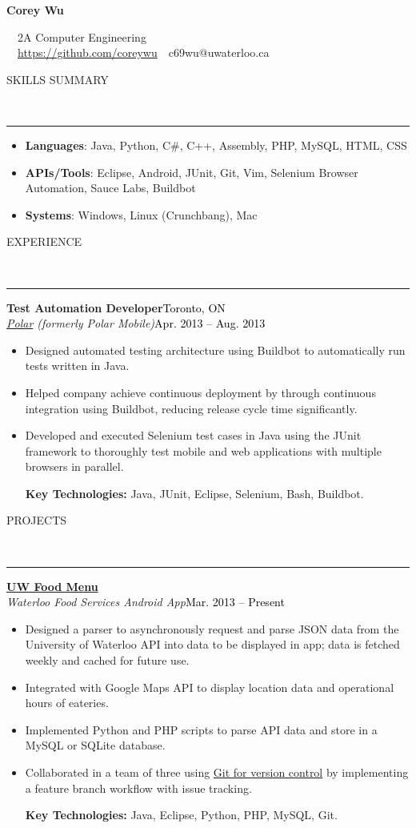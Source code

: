 \documentclass[11pt, letterpaper, oneside]{article}
\makeatletter
\newcommand{\name}{Corey Wu}
\newcommand{\program}{2A Computer Engineering}
\newcommand{\github}{\href{https://github.com/coreywu}{https://github.com/coreywu}}
\newcommand{\email}{c69wu@uwaterloo.ca}
\newcommand{\HRule}[2]{\textcolor{#1}{\rule{\linewidth}{#2}}}
\newcommand{\sectiontitle}[1]{\begin{minipage}{\textwidth}\vspace{-7.5pt}\begin{flushleft}\hspace{-20.5pt}\vspace{-25pt}
\Large\MakeUppercase{#1}\end{flushleft}\end{minipage}\\\HRule{black}{0.15mm}\vspace{\baselineskip}}
\newenvironment{ressection}[1]{
  \sectiontitle{#1}}
  {\vspace{-\baselineskip}}
\newcommand{\resentryheader}[4]{
    \vspace{-6pt}
    \textbf{#1}\hspace{\stretch{1}}\textcolor{black}{#3}\\
    \textit{#2}\hspace{\stretch{1}}\textcolor{black}{#4}\\
}
\newcommand{\resitem}[1]{
    \vspace{2pt}
    \item \begin{flushleft} #1 \end{flushleft}
}
\newcommand{\resskillsitem}[2]{
	\vspace{-12pt}
    \item \begin{flushleft} \textbf{#1}: #2 \end{flushleft}
    \vspace{4pt}
}
\newenvironment{resentry}[4]{
  \begin{minipage}{\textwidth}
    \resentryheader{#1}{#2}{#3}{#4}
        \vspace{-\baselineskip}
    \begin{itemize}[noitemsep,nolistsep]
}{
    \end{itemize}
        \vspace{\baselineskip}
        \end{minipage}
}
\makeatother
\begin{document}
\begin{center}
{\Huge \textbf{\name}}

\ \ {\Large{\program}} \\
\ \ \github \ \textbullet \ \email \ \
\end{center}

\vspace{-10pt}

\begin{ressection}{Skills Summary}
\begin{itemize}
\vspace{-6.5pt}
\resskillsitem{Languages}{Java, Python, C\#, C++, Assembly, PHP, MySQL, HTML, CSS}
\resskillsitem{APIs/Tools}{Eclipse, Android, JUnit, Git, Vim, Selenium Browser Automation, Sauce Labs, Buildbot}
\resskillsitem{Systems}{Windows, Linux (Crunchbang), Mac}
\end{itemize}
\end{ressection}

\begin{ressection}{Experience}
  \begin{resentry}{Test Automation Developer}{\href{http://polar.me/}{Polar} (formerly Polar Mobile)}{Toronto, ON}{Apr. 2013 -- Aug. 2013}
    \resitem{Designed automated testing architecture using Buildbot to automatically run tests written in Java.}
    \resitem{Helped company achieve continuous deployment by through continuous integration using Buildbot, reducing release cycle time significantly.}
    \resitem{Developed and executed Selenium test cases in Java using the JUnit framework to thoroughly test mobile and web applications with multiple browsers in parallel.}
    \vspace{4pt} \hspace{-15pt}
    \textbf{Key Technologies:} Java, JUnit, Eclipse, Selenium, Bash, Buildbot.
  \end{resentry}
\end{ressection}

\begin{ressection}{Projects}
  \begin{resentry}{\href{https://play.google.com/store/apps/details?id=ca.uwaterloo.uwfoodservices&hl=en}{UW Food Menu}}{Waterloo Food Services Android App}{}{Mar. 2013 -- Present}
    \resitem{Designed a parser to asynchronously request and parse JSON data from the University of Waterloo API into data to be displayed in app; data is fetched weekly and cached for future use.}
    \resitem{Integrated with Google Maps API to display location data and operational hours of eateries.}
    \resitem{Implemented Python and PHP scripts to parse API data and store in a MySQL or SQLite database.}
    \resitem{Collaborated in a team of three using \href{https://github.com/shamak/FoodMenuUW/tree/DEV_1.2}{Git for version control} by implementing a feature branch workflow with issue tracking.}
    \vspace{4pt} \hspace{-15pt}
    \textbf{Key Technologies:} Java, Eclipse, Python, PHP, MySQL, Git.
  \end{resentry}
\end{ressection}
\end{document}
